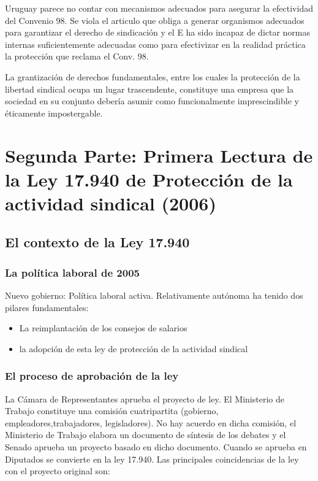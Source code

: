 \documentclass[spanish,12pt,a4paper,titlepage]{report}
\begin{document}
Uruguay parece no contar con mecanismos adecuados para asegurar la efectividad del Convenio 98. Se viola el articulo que obliga a generar organismos adecuados para garantizar el derecho de sindicación y el E ha sido incapaz de dictar normas internas suficientemente adecuadas como para efectivizar en la realidad práctica la protección que reclama el Conv. 98.

La grantización de derechos fundamentales, entre los cuales la protección de la libertad sindical ocupa un lugar trascendente, constituye una empresa que la sociedad en su conjunto debería asumir como funcionalmente imprescindible y éticamente impostergable.

\section{Segunda Parte: Primera Lectura de la Ley 17.940 de Protección de la actividad sindical (2006)}

\subsection{El contexto de la Ley 17.940}

\subsubsection{La política laboral de 2005}

Nuevo gobierno: Política laboral activa. Relativamente autónoma ha tenido dos pilares fundamentales:
\begin{itemize}
\item La reimplantación de los consejos de salarios
\item la adopción de esta ley de protección de la actividad sindical
\end{itemize}

\subsubsection{El proceso de aprobación de la ley}

La Cámara de Representantes aprueba el proyecto  de ley. El Ministerio de Trabajo constituye una comisión cuatripartita (gobierno, empleadores,trabajadores, legisladores). No hay acuerdo en dicha comisión, el Ministerio de Trabajo elabora un documento de síntesis de los debates y el Senado aprueba un proyecto basado en dicho documento. Cuando se aprueba en Diputados se convierte en la ley 17.940.
Las principales coincidencias de la ley con el proyecto original son:
\end{document}
